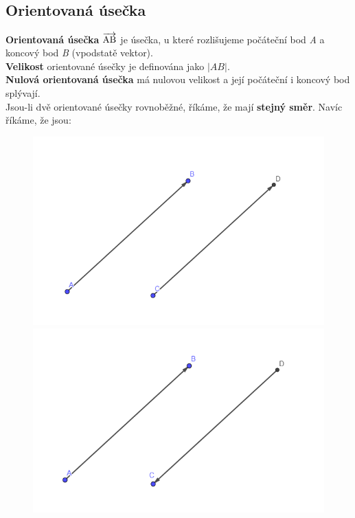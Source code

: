 \documentclass[12pt, a4paper]{article}
\begin{document}
\subsection*{Orientovaná úsečka}
\textbf{Orientovaná úsečka }$\overrightarrow{\rm AB}$ je úsečka, u které rozlišujeme počáteční bod \textit{A} a koncový bod \textit{B} (vpodstatě vektor).\\
\textbf{Velikost} orientované úsečky je definována jako $|AB|$.\\
\textbf{Nulová orientovaná úsečka} má nulovou velikost a její počáteční i koncový bod splývají.\\
Jsou-li dvě orientované úsečky rovnoběžné, říkáme, že mají \textbf{stejný směr}. Navíc říkáme, že jsou:\\
\begin{figure}[H]
\centering
\begin{minipage}{0.45\textwidth}
\includegraphics[scale=0.4]{orient1}
\end{minipage}
\begin{minipage}{0.45\textwidth}
\includegraphics[scale=0.4]{orient2}
\end{minipage}
\end{figure} 
\end{document}
